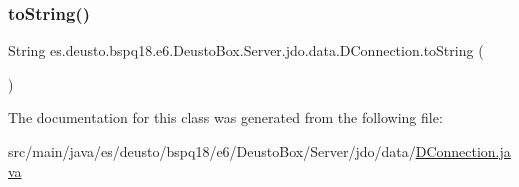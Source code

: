 \subsubsection{\texorpdfstring{to\+String()}{toString()}}
{\footnotesize\ttfamily String es.\+deusto.\+bspq18.\+e6.\+Deusto\+Box.\+Server.\+jdo.\+data.\+D\+Connection.\+to\+String (\begin{DoxyParamCaption}{ }\end{DoxyParamCaption})}



The documentation for this class was generated from the following file\+:\begin{DoxyCompactItemize}
\item 
src/main/java/es/deusto/bspq18/e6/\+Deusto\+Box/\+Server/jdo/data/\mbox{\hyperlink{_d_connection_8java}{D\+Connection.\+java}}\end{DoxyCompactItemize}
